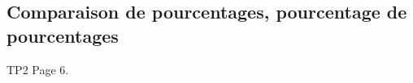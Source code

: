 \documentclass[12pt,a4paper]{article}
\begin{document}
\begin{myexs}
\end{myexs}

\subsection{Comparaison de pourcentages, pourcentage de pourcentages}

TP2 Page 6.
\end{document}
